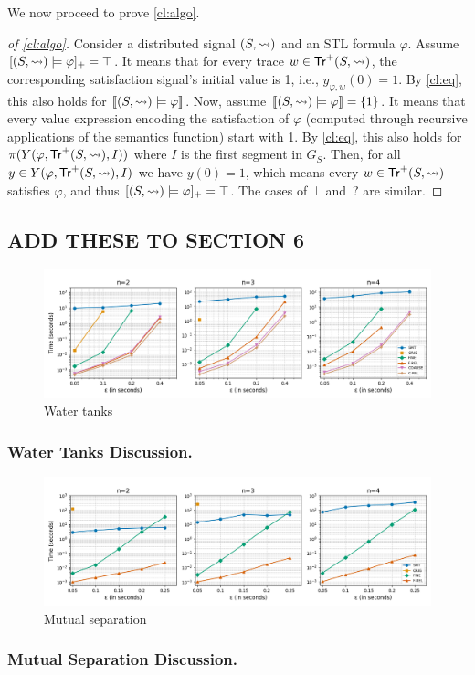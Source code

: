 We now proceed to prove \cref{cl:algo}.

\begin{proof}[of \cref{cl:algo}]
	Consider a distributed signal $(S,{\rightsquigarrow})$ and an STL formula $\varphi$.
	Assume $[(S,{\rightsquigarrow}) \models \varphi]_+ = \top$.
	It means that for every trace $w \in \mathsf{Tr}^+(S,{\rightsquigarrow})$, the corresponding satisfaction signal's initial value is 1, i.e., $y_{\varphi,w}(0) = 1$.
	By \cref{cl:eq}, this also holds for $\llbracket (S, {\rightsquigarrow}) \models \varphi \rrbracket$.
	Now, assume  $\llbracket (S, {\rightsquigarrow}) \models \varphi \rrbracket = \{1\}$.
	It means that every value expression encoding the satisfaction of $\varphi$ (computed through recursive applications of the semantics function) start with 1.
	By \cref{cl:eq}, this also holds for $\pi(Y(\varphi, \mathsf{Tr}^+(S,{\rightsquigarrow}), I))$ where $I$ is the first segment in $G_S$.
	Then, for all $y \in Y(\varphi, \mathsf{Tr}^+(S,{\rightsquigarrow}), I)$ we have $y(0) = 1$, which means every $w \in \mathsf{Tr}^+(S,{\rightsquigarrow})$ satisfies $\varphi$, and thus $[(S,{\rightsquigarrow}) \models \varphi]_+ = \top$.
	The cases of $\bot$ and ${\,?}$ are similar.
%
\end{proof}


\subsection*{ADD THESE TO SECTION 6}

\begin{figure}[htb]
	\begin{center}
		\includegraphics[width=\linewidth]{wt.png}
		\caption{Water tanks}
	\end{center}
\end{figure}

\subsubsection{Water Tanks Discussion.}
\TODO

\begin{figure}[htb]
	\begin{center}
		\includegraphics[width=\linewidth]{ms.png}
		\caption{Mutual separation}
	\end{center}
\end{figure}

\subsubsection{Mutual Separation Discussion.}
\TODO
